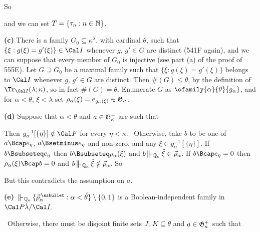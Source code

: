 {\noindent So


\noindent and we can set $T=\{\tau_n:n\in\Bbb N\}$.\ \Qed

\medskip

{\bf (c)} There is a family $G_0\subseteq\kappa^{\lambda}$, with cardinal
$\theta$, such that
$\{\xi:g(\xi)=g'(\xi)\}\in\Cal I$ whenever $g$, $g'\in G$ are distinct
(541F again),
and we can suppose that every member of $G_0$ is injective (see
part (a) of the proof of 555E).   Let $G\supseteq G_0$
be a maximal family such that
$\{\xi:g(\xi)=g'(\xi)\}$ belongs to $\Cal I$ whenever $g$, $g'\in G$ are
distinct.   Then $\#(G)\le\theta$, by the definition of
$\Tr_{\Cal I}(\lambda;\kappa)$, so in fact $\#(G)=\theta$.
Enumerate $G$ as $\ofamily{\alpha}{\theta}{g_{\alpha}}$, and for
$\alpha<\theta$, $\xi<\lambda$ set
$\rho_{\alpha}(\xi)=e_{g_{\alpha}(\xi)}\in\frak G_{\kappa}$.

\medskip

{\bf (d)} Suppose that $\alpha<\theta$ and
$a\in\frak G_{\kappa}^+$ are such that


\noindent Then $g_{\alpha}^{-1}[\{\eta\}]\notin\Cal F$ for
every $\eta<\kappa$.   \Prf\Quer\ Otherwise, take $b$ to be one of
$a\Bcap e_{\eta}$, $a\Bsetminus e_{\eta}$ and non-zero, and any
$\xi\in g_{\alpha}^{-1}[\{\eta\}]$.
If $b\Bsubseteq e_{\eta}$ then $b\Bsubseteq\rho_{\alpha}(\xi)$ and
$b\VVdQk\,\check\xi\in\vec\rho_{\alpha}$.   If
$b\Bcap e_{\eta}=0$ then $\rho_{\alpha}(\xi)\Bcap b=0$ and
$b\VVdQk\,\check\xi\notin\vec\rho_{\alpha}$.   So


\noindent But this contradicts the assumption on $a$.\ \Bang\Qed

\medskip

{\bf (e)} $\VVdQk\,
\{\vec\rho_{\alpha}^{\mskip4mu\ssbullet}:
\alpha<\check\theta\}\setminus\{0,1\}$
is a Boolean-independent family in $\Cal P\check\lambda/\dot{\Cal I}$.

\Prf\Quer\ Otherwise, there must be disjoint finite sets $J$,
$K\subseteq\theta$ and $a\in\frak G_{\kappa}^+$ such that

}
